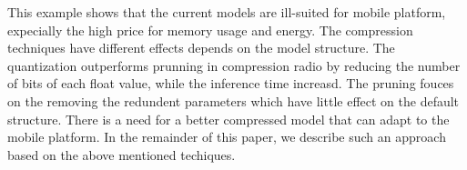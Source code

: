 This example shows that the current models are ill-suited for mobile platform,
expecially the high price for memory usage and energy.
The compression techniques have different effects depends on the model 
structure.
The quantization outperforms prunning in compression radio by
reducing the number of bits of each float value, while the inference time increasd.
The pruning fouces on the removing the redundent parameters which have little effect 
on the default structure.
There is a need for a better compressed
model that can adapt to the mobile platform. In the remainder of this
paper, we describe such an approach based on the above mentioned techiques.



